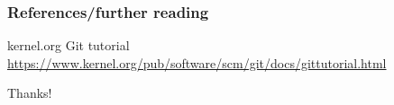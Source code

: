 \documentclass{beamer}
\begin{document}

\begin{frame}
\frametitle{References/further reading}
\footnotesize{
\begin{thebibliography}{99} %
 kernel.org
\newblock Git tutorial
\newblock \url{https://www.kernel.org/pub/software/scm/git/docs/gittutorial.html}
\end{thebibliography}
}
\end{frame}

\begin{frame}
\Huge{\centerline{Thanks!}}
\end{frame}
\end{document}
